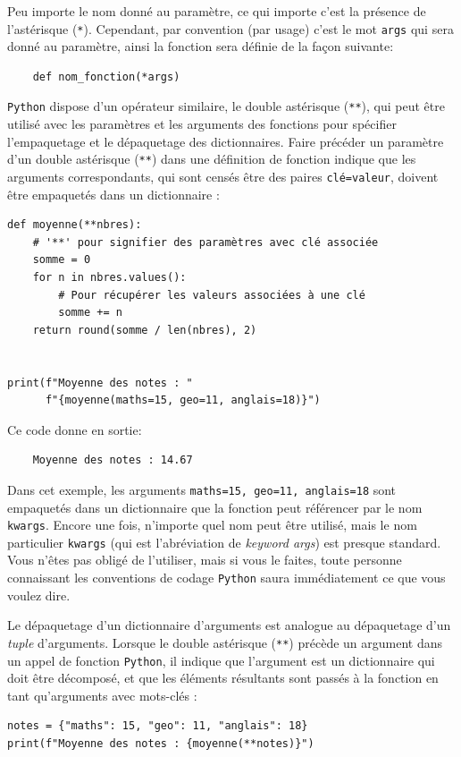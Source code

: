 \documentclass[a4paper,12pt]{book}
\begin{document}
Peu importe le nom donné au paramètre, ce qui importe c'est la présence de l'astérisque (\texttt{*}). Cependant, par convention (par usage) c'est le mot \texttt{args} qui sera donné au paramètre, ainsi la fonction sera définie de la façon suivante:
\begin{verbatim}
    def nom_fonction(*args)
\end{verbatim}
\medskip

\texttt{Python} dispose d'un opérateur similaire, le double astérisque (\texttt{**}), qui peut être utilisé avec les paramètres et les arguments des fonctions pour spécifier l'empaquetage et le dépaquetage des dictionnaires. Faire précéder un paramètre d'un double astérisque (\texttt{**}) dans une définition de fonction indique que les arguments correspondants, qui sont censés être des paires \texttt{clé=valeur}, doivent être empaquetés dans un dictionnaire :
\begin{lstlisting}[caption=Paramètres avec clé associée]
def moyenne(**nbres):
    # '**' pour signifier des paramètres avec clé associée
    somme = 0
    for n in nbres.values():
        # Pour récupérer les valeurs associées à une clé
        somme += n
    return round(somme / len(nbres), 2)


print(f"Moyenne des notes : "
      f"{moyenne(maths=15, geo=11, anglais=18)}")
\end{lstlisting}
\medskip

Ce code donne en sortie:
\begin{verbatim}
    Moyenne des notes : 14.67
\end{verbatim}
\medskip

Dans cet exemple, les arguments \texttt{maths=15, geo=11, anglais=18} sont empaquetés dans un dictionnaire que la fonction peut référencer par le nom \texttt{kwargs}. Encore une fois, n'importe quel nom peut être utilisé, mais le nom particulier \texttt{kwargs} (qui est l'abréviation de \og \textit{keyword args}\fg{}) est presque standard. Vous n'êtes pas obligé de l'utiliser, mais si vous le faites, toute personne connaissant les conventions de codage \texttt{Python} saura immédiatement ce que vous voulez dire.
\medskip

Le dépaquetage d'un dictionnaire d'arguments est analogue au dépaquetage d'un \textit{tuple} d'arguments. Lorsque le double astérisque (\texttt{**}) précède un argument dans un appel de fonction \texttt{Python}, il indique que l'argument est un dictionnaire qui doit être décomposé, et que les éléments résultants sont passés à la fonction en tant qu'arguments avec mots-clés :
\begin{lstlisting}[caption=Dépaquetage d'un dictionnaire]
notes = {"maths": 15, "geo": 11, "anglais": 18}
print(f"Moyenne des notes : {moyenne(**notes)}")
\end{lstlisting}
\medskip
\end{document}
